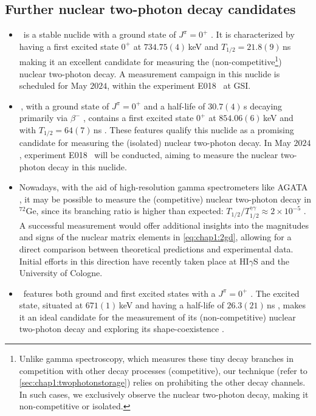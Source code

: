 \subsection{Further nuclear two-photon decay candidates}\label{subsec:concl:candidates}
\begin{itemize}
    \item \, is a stable nuclide with a ground state of $J^{\pi}=0^{+}$ \cite{A98}. It is characterized by having a first excited state $0^{+}$ at $734.75(4)$\,keV and $T_{1/2}=21.8(9)$\,ns \cite{A98} making it an excellent candidate for measuring the (non-competitive\footnote{Unlike gamma spectroscopy, which measures these tiny decay branches in competition with other decay processes (competitive), our technique (refer to \cref{sec:chap1:twophotonstorage}) relies on prohibiting the other decay channels. In such cases, we exclusively observe the nuclear two-photon decay, making it non-competitive or isolated.}) nuclear two-photon decay. A measurement campaign in this nuclide is scheduled for May $2024$, within the experiment \textsc{E018}~\cite{E018proposal} at \textsc{GSI}.
    \item \,, with a ground state of $J^{\pi}=0^{+}$ and a half-life of $30.7(4)$\,s decaying primarily via $\beta^{-}$ \cite{A98}, contains a first excited state $0^{+}$ at $854.06(6)$\,keV and with $T_{1/2}=64(7)$\,ns \cite{A98}. These features qualify this nuclide as a promising candidate for measuring the (isolated) nuclear two-photon decay. In May $2024$, experiment \textsc{E018}~\cite{E018proposal} will be conducted, aiming to measure the nuclear two-photon decay in this nuclide. 
    \item Nowadays, with the aid of high-resolution gamma spectrometers like \textsc{AGATA} \cite{AGATA}, it may be possible to measure the (competitive) nuclear two-photon decay in $^{72}\mathrm{Ge}$, since its branching ratio is higher than expected: $T_{1/2}/T_{1/2}^{\gamma\gamma} \approx 2\times10^{-5}$ \cite{freirefernández2023measurement}. A successful measurement would offer additional insights into the magnitudes and signs of the nuclear matrix elements in \cref{eq:chap1:2gd}, allowing for a direct comparison between theoretical predictions and experimental data. 
    Initial efforts in this direction have recently taken place at \textsc{HI$\gamma$S} \cite{higs72geproposal} and the University of Cologne.
    \item \, features both ground and first excited states with a $J^\pi=0^{+}$ \cite{A72}. The excited state, situated at $671(1)$\,keV and having a half-life of $26.3(21)$\,ns \cite{A72}, makes it an ideal candidate for the measurement of its (non-competitive) nuclear two-photon decay and exploring its shape-coexistence \cite{PhysRevLett.90.082502}. 

\end{itemize}
